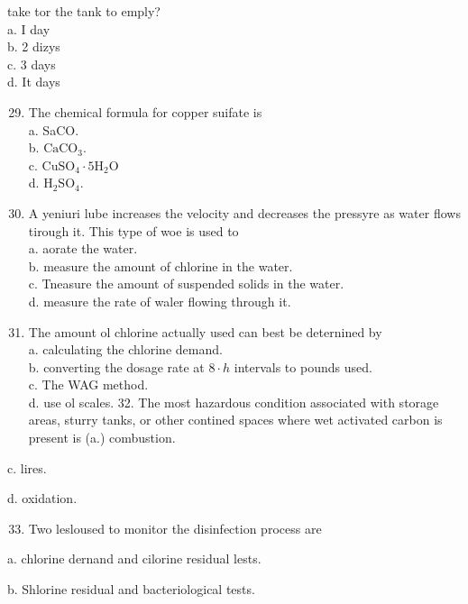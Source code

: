 \documentclass[10pt]{article}
\begin{document}
take tor the tank to emply?\\
a. I day\\
b. 2 dizys\\
c. 3 days\\
d. It days

\begin{enumerate}
  \setcounter{enumi}{28}
  \item The chemical formula for copper suifate is\\
a. SaCO.\\
b. $\mathrm{CaCO}_{3}$.\\
c. $\mathrm{CuSO}_{4} \cdot 5 \mathrm{H}_{2} \mathrm{O}$\\
d. $\mathrm{H}_{2} \mathrm{SO}_{4}$.

  \item A yeniuri lube increases the velocity and decreases the pressyre as water flows tirough it. This type of woe is used to\\
a. aorate the water.\\
b. measure the amount of chlorine in the water.\\
c. Tneasure the amount of suspended solids in the water.\\
d. measure the rate of waler flowing through it.

  \item The amount ol chlorine actually used can best be deternined by\\
a. calculating the chlorine demand.\\
b. converting the dosage rate at $8 \cdot h$ intervals to pounds used.\\
c. The WAG method.\\
d. use ol scales. 32. The most hazardous condition associated with storage areas, sturry tanks, or other contined spaces where wet activated carbon is present is (a.) combustion.

\end{enumerate}

c. lires.

d. oxidation.

\begin{enumerate}
  \setcounter{enumi}{32}
  \item Two lesloused to monitor the disinfection process are
\end{enumerate}

a. chlorine dernand and cilorine residual lests.

b. Shlorine residual and bacteriological tests.
\end{document}
